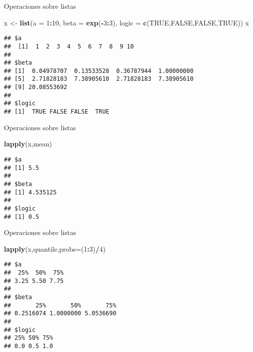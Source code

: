 \documentclass[ignorenonframetext,]{beamer}
\newenvironment{Shaded}{\begin{snugshade}}{\end{snugshade}}
\newcommand{\KeywordTok}[1]{\textcolor[rgb]{0.13,0.29,0.53}{\textbf{#1}}}
\newcommand{\DataTypeTok}[1]{\textcolor[rgb]{0.13,0.29,0.53}{#1}}
\newcommand{\DecValTok}[1]{\textcolor[rgb]{0.00,0.00,0.81}{#1}}
\newcommand{\StringTok}[1]{\textcolor[rgb]{0.31,0.60,0.02}{#1}}
\newcommand{\OtherTok}[1]{\textcolor[rgb]{0.56,0.35,0.01}{#1}}
\newcommand{\OperatorTok}[1]{\textcolor[rgb]{0.81,0.36,0.00}{\textbf{#1}}}
\newcommand{\NormalTok}[1]{#1}
\begin{document}
\begin{frame}[fragile]{Operaciones sobre listas}

\begin{Shaded}
\begin{Highlighting}[]
\NormalTok{x <-}\StringTok{ }\KeywordTok{list}\NormalTok{(}\DataTypeTok{a =} \DecValTok{1}\OperatorTok{:}\DecValTok{10}\NormalTok{, }\DataTypeTok{beta =} \KeywordTok{exp}\NormalTok{(}\OperatorTok{-}\DecValTok{3}\OperatorTok{:}\DecValTok{3}\NormalTok{),}
          \DataTypeTok{logic =} \KeywordTok{c}\NormalTok{(}\OtherTok{TRUE}\NormalTok{,}\OtherTok{FALSE}\NormalTok{,}\OtherTok{FALSE}\NormalTok{,}\OtherTok{TRUE}\NormalTok{))}
\NormalTok{x}
\end{Highlighting}
\end{Shaded}

\begin{verbatim}
## $a
##  [1]  1  2  3  4  5  6  7  8  9 10
## 
## $beta
## [1]  0.04978707  0.13533528  0.36787944  1.00000000 
## [5]  2.71828183  7.38905610  2.71828183  7.38905610 
## [9] 20.08553692
## 
## $logic
## [1]  TRUE FALSE FALSE  TRUE
\end{verbatim}

\end{frame}

\begin{frame}[fragile]{Operaciones sobre listas}

\begin{Shaded}
\begin{Highlighting}[]
\KeywordTok{lapply}\NormalTok{(x,mean)}
\end{Highlighting}
\end{Shaded}

\begin{verbatim}
## $a
## [1] 5.5
## 
## $beta
## [1] 4.535125
## 
## $logic
## [1] 0.5
\end{verbatim}

\end{frame}

\begin{frame}[fragile]{Operaciones sobre listas}

\begin{Shaded}
\begin{Highlighting}[]
\KeywordTok{lapply}\NormalTok{(x,quantile,}\DataTypeTok{probs=}\NormalTok{(}\DecValTok{1}\OperatorTok{:}\DecValTok{3}\NormalTok{)}\OperatorTok{/}\DecValTok{4}\NormalTok{)}
\end{Highlighting}
\end{Shaded}

\begin{verbatim}
## $a
##  25%  50%  75% 
## 3.25 5.50 7.75 
## 
## $beta
##       25%       50%       75% 
## 0.2516074 1.0000000 5.0536690 
## 
## $logic
## 25% 50% 75% 
## 0.0 0.5 1.0
\end{verbatim}

\end{frame}
\end{document}
